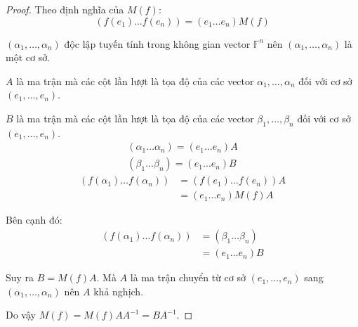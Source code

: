 \documentclass[class=linearalgebra,crop=false]{standalone}
\begin{document}
\begin{proof}
    Theo định nghĩa của $M(f)$:
    \[
        (f(e_{1}) \ldots f(e_{n})) = (e_{1} \ldots e_{n})M(f)
    \]
    \par $(\alpha_{1}, \ldots, \alpha_{n})$ độc lập tuyến tính trong không gian vector $\mathbb{F}^{n}$ nên $(\alpha_{1}, \ldots, \alpha_{n})$ là một cơ sở.
    \par $A$ là ma trận mà các cột lần lượt là tọa độ của các vector $\alpha_{1}, \ldots, \alpha_{n}$ đối với cơ sở $(e_{1}, \ldots, e_{n})$.
    \par $B$ là ma trận mà các cột lần lượt là tọa độ của các vector $\beta_{1}, \ldots, \beta_{n}$ đối với cơ sở $(e_{1}, \ldots, e_{n})$.
    \[
        \begin{split}
            (\alpha_{1} \ldots \alpha_{n}) = (e_{1} \ldots e_{n})A \\
            (\beta_{1} \ldots \beta_{n}) = (e_{1} \ldots e_{n})B
        \end{split}
    \]
    \begin{align*}
        (f(\alpha_{1})\ldots f(\alpha_{n})) & = (f(e_{1})\ldots f(e_{n}))A \\
                                            & = (e_{1}\ldots e_{n})M(f)A
    \end{align*}
    \par Bên cạnh đó:
    \begin{align*}
        (f(\alpha_{1})\ldots f(\alpha_{n})) & = (\beta_{1} \ldots \beta_{n}) \\
                                            & = (e_{1} \ldots e_{n})B
    \end{align*}
    \par Suy ra $B = M(f)A$. Mà $A$ là ma trận chuyển từ cơ sở $(e_{1}, \ldots, e_{n})$ sang $(\alpha_{1}, \ldots, \alpha_{n})$ nên $A$ khả nghịch.
    \par Do vậy $M(f) = M(f)AA^{-1} = BA^{-1}$.
\end{proof}
\end{document}
